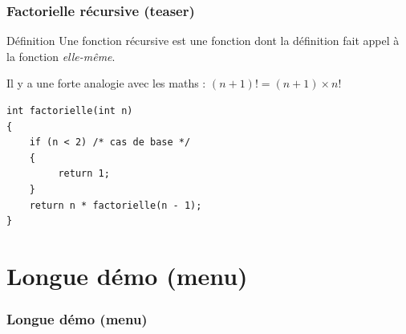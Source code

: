 \documentclass[xcolor=pdftex,svgnames,table]{beamer}
\begin{document}
\begin{frame}[fragile]
  \frametitle{Factorielle récursive (teaser)}
  \begin{block}{Définition}
    Une fonction récursive est une fonction dont la définition fait
    appel à la fonction \emph{elle-même}.
  \end{block}

\pause
Il y a une forte analogie avec les maths : $(n + 1)! = (n + 1) \times n!$

\pause
\begin{lstlisting}[escapechar={\%},basicstyle=\ttfamily\small] 
int factorielle(int n)
{
    if (n < 2) /* cas de base */
    {
         return 1;
    } 
    return n * factorielle(n - 1); 
}
\end{lstlisting}
\end{frame}

\section[Démos]{Longue démo (menu)}
\begin{frame}
  \frametitle{Longue démo (menu)}
\end{frame}
\end{document}
